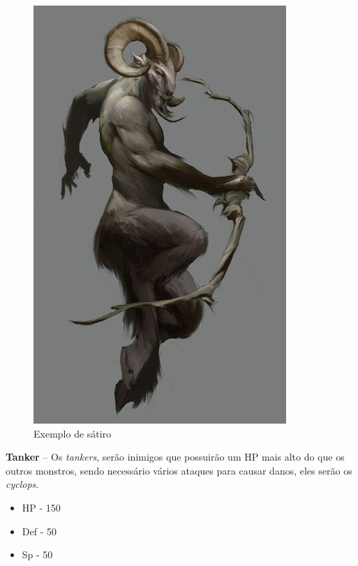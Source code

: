 \documentclass[11pt]{article} %
\begin{document}
\begin{figure}[!htp]
\centering
\includegraphics[scale=0.25]{res/characters/satiro.jpg}
\caption{Exemplo de sátiro}
\label{satiro}
\end{figure}

\textbf{{\large Tanker}} – Os \textit{tankers}, serão inimigos que possuirão um HP mais alto do que os outros monstros, sendo necessário vários ataques para causar danos, eles serão os \textit{cyclops}.
\begin{itemize}
\item HP - 150
\item Def - 50
\item Sp - 50
\end{itemize}
\end{document}
